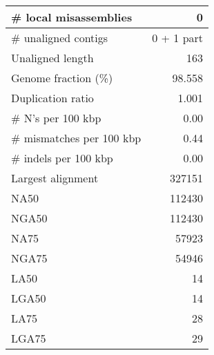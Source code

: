 \documentclass[12pt,a4paper]{article}
\begin{document}
\begin{table}[ht]
\begin{center}
\begin{tabular}{|l*{1}{|r}|}
\# local misassemblies & 0 \\ \hline
\# unaligned contigs & 0 + 1 part \\ \hline
Unaligned length & 163 \\ \hline
Genome fraction (\%) & 98.558 \\ \hline
Duplication ratio & 1.001 \\ \hline
\# N's per 100 kbp & 0.00 \\ \hline
\# mismatches per 100 kbp & 0.44 \\ \hline
\# indels per 100 kbp & 0.00 \\ \hline
Largest alignment & 327151 \\ \hline
NA50 & 112430 \\ \hline
NGA50 & 112430 \\ \hline
NA75 & 57923 \\ \hline
NGA75 & 54946 \\ \hline
LA50 & 14 \\ \hline
LGA50 & 14 \\ \hline
LA75 & 28 \\ \hline
LGA75 & 29 \\ \hline
\end{tabular}
\end{center}
\end{table}
\end{document}
